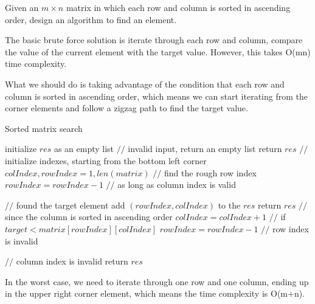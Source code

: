 \newpage
{} %

\problemdes

Given an $m \times n$ matrix in which each row and column is sorted in ascending order, design an algorithm to find an element.

\solution


The basic brute force solution is iterate through each row and column, compare the value of the current element with the target value. However, this takes O(mn) time complexity. 

What we should do is taking advantage of the condition that each row and column is sorted in ascending order, which means we can start iterating from the corner elements and follow a zigzag path to find the target value. 


\begin{algorithm}
  \caption{Sorted matrix search}
  initialize $res$ as an empty list\;
  {
  	$//$ invalid input, return an empty list\;
  	return $res$\;
  }
  $//$ initialize indexes, starting from the bottom left corner\;
  $colIndex, rowIndex = 1, len(matrix)$\;
  $//$ find the rough row index\;
  {
  	$rowIndex = rowIndex-1$\;
  }
  $//$ as long as column index is valid\;
  {
    {
       $//$ found the target element\;
       add $(rowIndex, colIndex)$ to the $res$\;
       return $res$\;
     }
    {
    	$//$ since the column is sorted in ascending order\;
    	$colIndex = colIndex+1$\;
     }
     $//$ if $target < matrix[rowIndex][colIndex]$\;
     {
     	$rowIndex = rowIndex-1$\;
     }
     $//$ row index is invalid\;
     
     $//$ column index is invalid\;
     return $res$\;
}
\end{algorithm}





In the worst case, we need to iterate through one row and one column, ending up in the upper right corner element, which means the time complexity is O(m+n).

